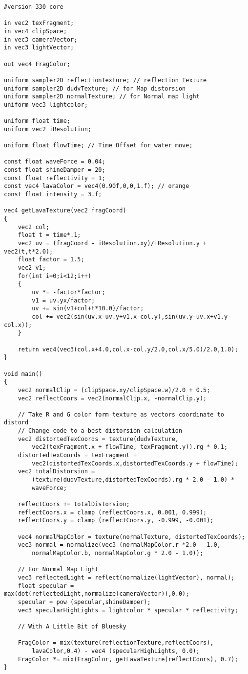 \begin{lstlisting}[style=glsl]
#version 330 core

in vec2 texFragment;
in vec4 clipSpace;
in vec3 cameraVector;
in vec3 lightVector;

out vec4 FragColor;

uniform sampler2D reflectionTexture; // reflection Texture
uniform sampler2D dudvTexture; // for Map distorsion
uniform sampler2D normalTexture; // for Normal map light
uniform vec3 lightcolor;

uniform float time;
uniform vec2 iResolution;

uniform float flowTime; // Time Offset for water move;

const float waveForce = 0.04;
const float shineDamper = 20;
const float reflectivity = 1;
const vec4 lavaColor = vec4(0.90f,0,0,1.f); // orange
const float intensity = 3.f;

vec4 getLavaTexture(vec2 fragCoord)
{
	vec2 col;
	float t = time*.1;
	vec2 uv = (fragCoord - iResolution.xy)/iResolution.y + vec2(t,t*2.0);
	float factor = 1.5;
	vec2 v1;
	for(int i=0;i<12;i++)
	{
		uv *= -factor*factor;
		v1 = uv.yx/factor;
		uv += sin(v1+col+t*10.0)/factor;
		col += vec2(sin(uv.x-uv.y+v1.x-col.y),sin(uv.y-uv.x+v1.y-col.x));
	}
	
	return vec4(vec3(col.x+4.0,col.x-col.y/2.0,col.x/5.0)/2.0,1.0);
}

void main()
{
	vec2 normalClip = (clipSpace.xy/clipSpace.w)/2.0 + 0.5;
	vec2 reflectCoors = vec2(normalClip.x, -normalClip.y);

	// Take R and G color form texture as vectors coordinate to distord
	// Change code to a best distorsion calculation
	vec2 distortedTexCoords = texture(dudvTexture,
		vec2(texFragment.x + flowTime, texFragment.y)).rg * 0.1;
	distortedTexCoords = texFragment + 
		vec2(distortedTexCoords.x,distortedTexCoords.y + flowTime);
	vec2 totalDistorsion = 
		(texture(dudvTexture,distortedTexCoords).rg * 2.0 - 1.0) * 
		waveForce;
	
	reflectCoors += totalDistorsion;
	reflectCoors.x = clamp (reflectCoors.x, 0.001, 0.999);
	reflectCoors.y = clamp (reflectCoors.y, -0.999, -0.001);
	
	vec4 normalMapColor = texture(normalTexture, distortedTexCoords);
	vec3 normal = normalize(vec3 (normalMapColor.r *2.0 - 1.0, 
		normalMapColor.b, normalMapColor.g * 2.0 - 1.0));
	
	// For Normal Map Light
	vec3 reflectedLight = reflect(normalize(lightVector), normal);
	float specular = max(dot(reflectedLight,normalize(cameraVector)),0.0);
	specular = pow (specular,shineDamper);
	vec3 specularHighLights = lightcolor * specular * reflectivity;

	// With A Little Bit of Bluesky

	FragColor = mix(texture(reflectionTexture,reflectCoors),
		lavaColor,0.4) - vec4 (specularHighLights, 0.0);
	FragColor *= mix(FragColor, getLavaTexture(reflectCoors), 0.7);
}
\end{lstlisting}